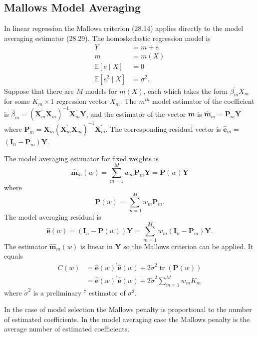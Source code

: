 \documentclass[10pt]{article}
\begin{document}
\subsection{Mallows Model Averaging}
In linear regression the Mallows criterion (28.14) applies directly to the model averaging estimator (28.29). The homoskedastic regression model is
$$
\begin{aligned}
Y &=m+e \\
m &=m(X) \\
\mathbb{E}[e \mid X] &=0 \\
\mathbb{E}\left[e^{2} \mid X\right] &=\sigma^{2} .
\end{aligned}
$$
Suppose that there are $M$ models for $m(X)$, each which takes the form $\beta_{m}^{\prime} X_{m}$ for some $K_{m} \times 1$ regression vector $X_{m}$. The $m^{t h}$ model estimator of the coefficient is $\widehat{\beta}_{m}=\left(\boldsymbol{X}_{m}^{\prime} \boldsymbol{X}_{m}\right)^{-1} \boldsymbol{X}_{m}^{\prime} \boldsymbol{Y}$, and the estimator of the vector $\boldsymbol{m}$ is $\widehat{\boldsymbol{m}}_{m}=\boldsymbol{P}_{m} \boldsymbol{Y}$ where $\boldsymbol{P}_{m}=\boldsymbol{X}_{m}\left(\boldsymbol{X}_{m}^{\prime} \boldsymbol{X}_{m}\right)^{-1} \boldsymbol{X}_{m}^{\prime}$. The corresponding residual vector is $\widehat{\boldsymbol{e}}_{m}=$ $\left(\boldsymbol{I}_{n}-\boldsymbol{P}_{m}\right) \boldsymbol{Y}$.

The model averaging estimator for fixed weights is
$$
\widehat{\boldsymbol{m}}_{m}(w)=\sum_{m=1}^{M} w_{m} \boldsymbol{P}_{m} \boldsymbol{Y}=\boldsymbol{P}(w) \boldsymbol{Y}
$$
where
$$
\boldsymbol{P}(w)=\sum_{m=1}^{M} w_{m} \boldsymbol{P}_{m} .
$$
The model averaging residual is
$$
\widehat{\boldsymbol{e}}(w)=\left(\boldsymbol{I}_{n}-\boldsymbol{P}(w)\right) \boldsymbol{Y}=\sum_{m=1}^{M} w_{m}\left(\boldsymbol{I}_{n}-\boldsymbol{P}_{m}\right) \boldsymbol{Y} .
$$
The estimator $\widehat{\boldsymbol{m}}_{m}(w)$ is linear in $\boldsymbol{Y}$ so the Mallows criterion can be applied. It equals
$$
\begin{aligned}
C(w) &=\widehat{\boldsymbol{e}}(w)^{\prime} \widehat{\boldsymbol{e}}(w)+2 \widetilde{\sigma}^{2} \operatorname{tr}(\boldsymbol{P}(w)) \\
&=\widehat{\boldsymbol{e}}(w)^{\prime} \widehat{\boldsymbol{e}}(w)+2 \widetilde{\sigma}^{2} \sum_{m=1}^{M} w_{m} K_{m}
\end{aligned}
$$
where $\widetilde{\sigma}^{2}$ is a preliminary ${ }^{7}$ estimator of $\sigma^{2}$.

In the case of model selection the Mallows penalty is proportional to the number of estimated coefficients. In the model averaging case the Mallows penalty is the average number of estimated coefficients.
\end{document}
